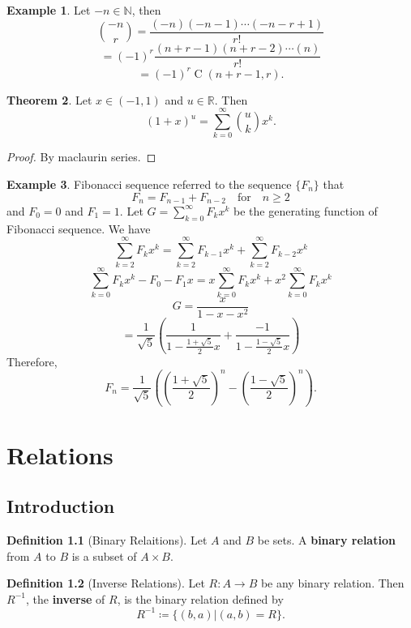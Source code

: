 \documentclass[12pt,a4paper]{report}
\theoremstyle{definition}
\newtheorem{theorem}{Theorem}[section]
\newtheorem{definition}[theorem]{Definition}
\newtheorem{example}[theorem]{Example}
\theoremstyle{remark}
\begin{document}
\begin{example}
    Let $-n \in \mathbb{N}$, then 
    \[\binom{-n}{r} = \frac{(-n)(-n - 1)\cdots(-n - r + 1)}{r!}\]
    \[= (-1)^r \frac{(n + r - 1)(n + r - 2) \cdots (n)}{r!}\]
    \[= (-1)^r \operatorname{C}(n + r - 1, r).\]
\end{example}

\begin{theorem}
    Let $x \in (-1, 1)$ and $u \in \mathbb{R}$. Then
    \[(1 + x)^u = \sum_{k = 0}^{\infty} \binom{u}{k} x^k.\]
\end{theorem}

\begin{proof}
    By maclaurin series.
\end{proof}

\begin{example}
    Fibonacci sequence referred to the sequence $\{F_n\}$ that 
    \[F_n = F_{n - 1} + F_{n - 2} \quad \text{for} \quad  n \geq 2\]
    and $F_0 = 0$ and $F_1 = 1$.
    Let $G = \sum_{k = 0}^{\infty} F_k x^k$ be the generating function of Fibonacci sequence. We have 
    \[\sum_{k = 2}^{\infty} F_k x^k = \sum_{k = 2}^{\infty} F_{k - 1} x^k + \sum_{k = 2}^{\infty} F_{k - 2} x^k\]
    \[\sum_{k = 0}^{\infty} F_k x^k - F_0 - F_1 x = x \sum_{k = 0}^{\infty} F_{k} x^k + x^2 \sum_{k = 0}^{\infty} F_{k} x^k\]
    \[G = \frac{x}{1 - x - x^2}\]
    \[= \frac{1}{\sqrt{5}}(\frac{1}{1 - \frac{1 + \sqrt{5}}{2}x} + \frac{-1}{1 - \frac{1 - \sqrt{5}}{2}x})\]
    Therefore, 
    \[F_n = \frac{1}{\sqrt{5}}\left(\left(\frac{1 + \sqrt{5}}{2}\right)^n - \left(\frac{1 - \sqrt{5}}{2}\right)^n \right).\]
\end{example}

\chapter{Relations}

\section{Introduction}

\begin{definition}[Binary Relaitions]
    Let $A$ and $B$ be sets. A \textbf{binary relation} from $A$ to $B$ is a subset of $A \times B$.
\end{definition}

\begin{definition}[Inverse Relations]
    Let $R: A \to B$ be any binary relation. Then $R^{-1}$, the \textbf{inverse} of $R$, is the binary relation defined by 
    \[R^{-1} \coloneq \{(b, a)|(a, b) = R\}.\]
\end{definition}
\end{document}
